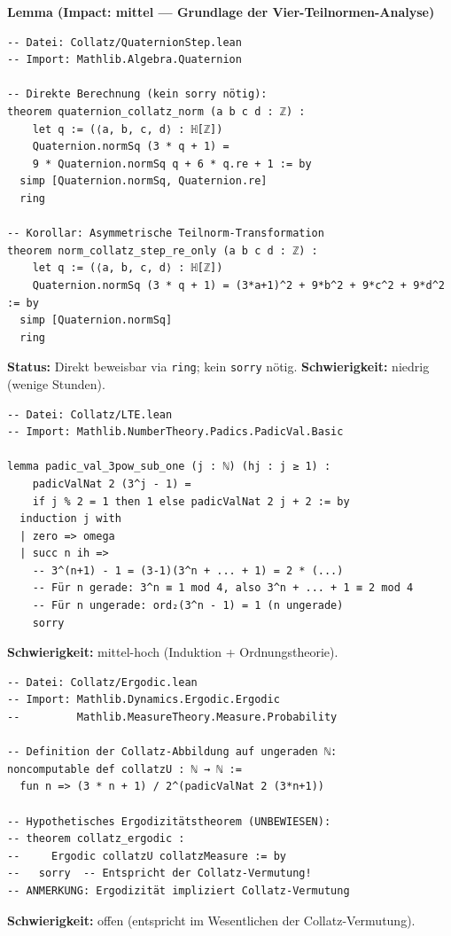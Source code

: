 \documentclass[12pt,a4paper]{article}
\newcommand{\vii}{\nu_2}
\begin{document}
\begin{tcolorbox}[roadmap, title={Priorität 5: Quaternionen-Norm-Identität}]
\textbf{Lemma (Impact: mittel --- Grundlage der Vier-Teilnormen-Analyse)}
\begin{lstlisting}[language=Lean4]
-- Datei: Collatz/QuaternionStep.lean
-- Import: Mathlib.Algebra.Quaternion

-- Direkte Berechnung (kein sorry nötig):
theorem quaternion_collatz_norm (a b c d : ℤ) :
    let q := (⟨a, b, c, d⟩ : ℍ[ℤ])
    Quaternion.normSq (3 * q + 1) =
    9 * Quaternion.normSq q + 6 * q.re + 1 := by
  simp [Quaternion.normSq, Quaternion.re]
  ring

-- Korollar: Asymmetrische Teilnorm-Transformation
theorem norm_collatz_step_re_only (a b c d : ℤ) :
    let q := (⟨a, b, c, d⟩ : ℍ[ℤ])
    Quaternion.normSq (3 * q + 1) = (3*a+1)^2 + 9*b^2 + 9*c^2 + 9*d^2 := by
  simp [Quaternion.normSq]
  ring
\end{lstlisting}
\textbf{Status:} Direkt beweisbar via \texttt{ring}; kein \texttt{sorry} nötig.
\textbf{Schwierigkeit:} niedrig (wenige Stunden).
\end{tcolorbox}

\begin{tcolorbox}[roadmap, title={Priorität 6: LTE-Valuation $\vii(3^j-1)$}]
\begin{lstlisting}[language=Lean4]
-- Datei: Collatz/LTE.lean
-- Import: Mathlib.NumberTheory.Padics.PadicVal.Basic

lemma padic_val_3pow_sub_one (j : ℕ) (hj : j ≥ 1) :
    padicValNat 2 (3^j - 1) =
    if j % 2 = 1 then 1 else padicValNat 2 j + 2 := by
  induction j with
  | zero => omega
  | succ n ih =>
    -- 3^(n+1) - 1 = (3-1)(3^n + ... + 1) = 2 * (...)
    -- Für n gerade: 3^n ≡ 1 mod 4, also 3^n + ... + 1 ≡ 2 mod 4
    -- Für n ungerade: ord₂(3^n - 1) = 1 (n ungerade)
    sorry
\end{lstlisting}
\textbf{Schwierigkeit:} mittel-hoch (Induktion + Ordnungstheorie).
\end{tcolorbox}

\begin{tcolorbox}[roadmap, title={Priorität 7: Ergodizitäts-Setup für Collatz}]
\begin{lstlisting}[language=Lean4]
-- Datei: Collatz/Ergodic.lean
-- Import: Mathlib.Dynamics.Ergodic.Ergodic
--         Mathlib.MeasureTheory.Measure.Probability

-- Definition der Collatz-Abbildung auf ungeraden ℕ:
noncomputable def collatzU : ℕ → ℕ :=
  fun n => (3 * n + 1) / 2^(padicValNat 2 (3*n+1))

-- Hypothetisches Ergodizitätstheorem (UNBEWIESEN):
-- theorem collatz_ergodic :
--     Ergodic collatzU collatzMeasure := by
--   sorry  -- Entspricht der Collatz-Vermutung!
-- ANMERKUNG: Ergodizität impliziert Collatz-Vermutung
\end{lstlisting}
\textbf{Schwierigkeit:} offen (entspricht im Wesentlichen der Collatz-Vermutung).
\end{tcolorbox}
\end{document}
